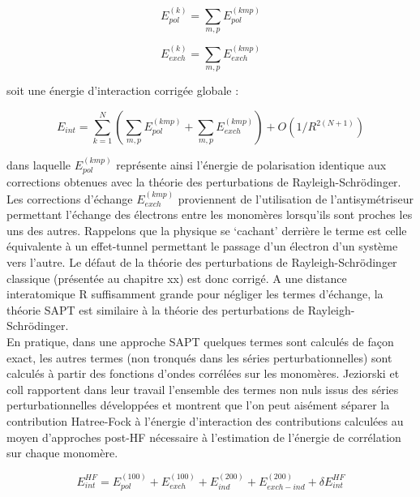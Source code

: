    		\begin{equation}
   		E_{pol}^{(k)} = \sum_{m,p} E_{pol}^{(kmp)}
   		\end{equation}
   		
   		\begin{equation}
   		E_{exch}^{(k)} = \sum_{m,p} E_{exch}^{(kmp)}
   		\end{equation}
   		
   		soit une énergie d’interaction corrigée globale :
   		
   		\begin{equation}
   		E_{int} = \sum_{k=1}^{N} ( \sum_{m,p} E_{pol}^{(kmp)} + \sum_{m,p} E_{exch}^{(kmp)} ) + O(1/R^{2 (N+1)})
   		\end{equation}
   		
   		dans laquelle $E_{pol}^{(kmp)}$ représente ainsi l'énergie de polarisation identique aux corrections obtenues avec la théorie des perturbations de Rayleigh-Schr\"{o}dinger. Les corrections
   			d'échange $E_{exch}^{(kmp)}$ proviennent de l'utilisation de l'antisymétriseur permettant l'échange des électrons entre les monomères lorsqu'ils sont proches les uns des autres. Rappelons que la physique se ‘cachant’ derrière le terme est celle équivalente à un effet-tunnel permettant le passage d’un électron d’un système vers l’autre. Le défaut de la théorie des perturbations de Rayleigh-Schr\"{o}dinger classique (présentée au chapitre xx) est donc corrigé.
   				A une distance interatomique R suffisamment grande pour négliger les termes d'échange,
   				la théorie SAPT est similaire à la théorie des perturbations de Rayleigh-Schr\"{o}dinger.\\
   				
   				
   				En pratique, dans une approche SAPT quelques termes sont calculés de façon exact, les autres termes (non tronqués dans les séries perturbationnelles) sont calculés à partir des fonctions d’ondes corrélées sur les monomères. Jeziorski et coll rapportent dans leur travail l’ensemble des termes non nuls issus des séries perturbationnelles développées et montrent que l’on peut aisément séparer la contribution Hatree-Fock à l’énergie d’interaction des contributions calculées au moyen d’approches post-HF nécessaire à l’estimation de l’énergie de corrélation sur chaque monomère. 
   				
   				\begin{equation}
   				E_{int}^{HF} =  E_{pol}^{(100)} + E_{exch}^{(100)} + E_{ind}^{(200)} + E_{exch-ind}^{(200)} + \delta E_{int}^{HF}
   				\end{equation}
   				
